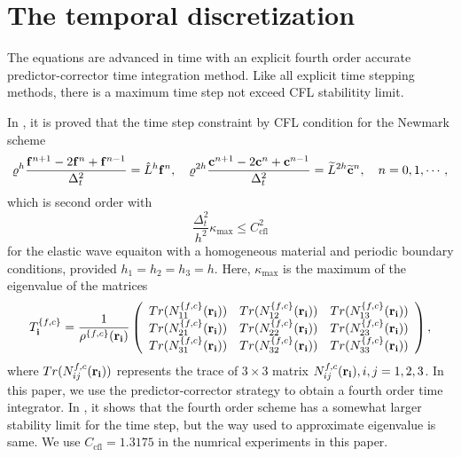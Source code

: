 \section{The temporal discretization}
The equations are advanced in time with an explicit fourth order accurate predictor-corrector time integration method. Like all explicit time stepping methods, there is a maximum time step not exceed CFL stabilitity limit.

In \cite{petersson2015wave}, it is proved that the time step constraint by CFL condition for the Newmark scheme 
\begin{equation*}
\varrho^h\frac{{\bf f}^{n+1}-2{\bf f}^n + {\bf f}^{n-1}}{\Delta_t^2} = \hat{L}^h {\bf f}^n, \ \ \ 
\varrho^{2h}\frac{{\bf c}^{n+1}-2{\bf c}^n + {\bf c}^{n-1}}{\Delta_t^2} = \wt{L}^{2h} \wt{\bf c}^n, \ \ \ n = 0,1,\cdots,
\end{equation*}
which is second order with
\begin{equation*}
\frac{\Delta_t^2}{h^2}\kappa_{\text{max}}\leq C_{\text{cfl}}^2
\end{equation*}
for the elastic wave equaiton with a homogeneous material and periodic boundary conditions, provided $h_1 = h_2 = h_3 = h$. Here, 
$\kappa_{\text{max}}$ is the maximum of the eigenvalue of the matrices 
\[T_{\bf i}^{\{f,c\}} = \frac{1}{\rho^{\{f,c\}}({\bf r}_{\bf i})}\left(\begin{array}{ccc}
Tr(N_{11}^{\{f,c\}}({\bf r}_{\bf i})) &  Tr(N_{12}^{\{f,c\}}({\bf r}_{\bf i}))& Tr(N_{13}^{\{f,c\}}({\bf r}_{\bf i}))\\
Tr(N_{21}^{\{f,c\}}({\bf r}_{\bf i})) & Tr(N_{22}^{\{f,c\}}({\bf r}_{\bf i})) & Tr(N_{23}^{\{f,c\}}({\bf r}_{\bf i}))\\
Tr(N_{31}^{\{f,c\}}({\bf r}_{\bf i})) & Tr(N_{32}^{\{f,c\}}({\bf r}_{\bf i})) & Tr(N_{33}^{\{f,c\}}({\bf r}_{\bf i}))\end{array}\right), \]
where $Tr(N_{ij}^{f,c}({\bf r}_{\bf i}))$ represents the trace of $3\times3$ matrix $N_{ij}^{f,c}({\bf r}_{\bf i}),i,j = 1,2,3$. In this paper, we use the predictor-corrector strategy to obtain a fourth order time integrator. In \cite{sjogreen2012fourth}, it shows that the fourth order scheme has a somewhat larger stability limit for the time step, but the way used to approximate eigenvalue is same. We use $C_{\text{cfl}} = 1.3175$ in the numrical experiments in this paper.
